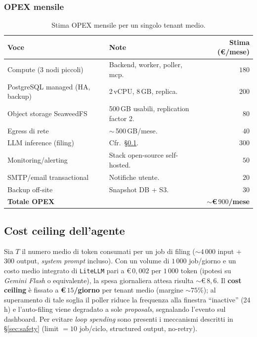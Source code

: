 \documentclass[11pt,a4paper,oneside]{article}
\begin{document}
\subsubsection{OPEX mensile}
\begin{table}[ht]
\centering
\small
\begin{tabularx}{\linewidth}{l X r}
\toprule
\textbf{Voce} & \textbf{Note} & \textbf{Stima (\euro/mese)} \\
\midrule
Compute (3 nodi piccoli)         & Backend, worker, poller, mcp.       & $180$ \\
PostgreSQL managed (HA, backup)  & 2\,vCPU, 8\,GB, replica.            & $200$ \\
Object storage SeaweedFS         & 500\,GB usabili, replication factor 2.& $80$ \\
Egress di rete                   & $\sim$\,500\,GB/mese.               & $40$ \\
LLM inference (filing)           & Cfr.\ \S\ref{sec:agent-cost}.        & $300$ \\
Monitoring/alerting              & Stack open-source self-hosted.      & $50$ \\
SMTP/email transactional         & Notifiche utente.                   & $20$ \\
Backup off-site                  & Snapshot DB + S3.                   & $30$ \\
\midrule
\textbf{Totale OPEX}             &                                     & \textbf{$\sim$\euro$\,900$/mese} \\
\bottomrule
\end{tabularx}
\caption{Stima OPEX mensile per un singolo tenant medio.}
\label{tab:opex}
\end{table}

\subsection{Cost ceiling dell'agente}
\label{sec:agent-cost}
Sia $T$ il numero medio di token consumati per un job di filing
($\sim 4\,000$ input + $300$ output, \emph{system prompt} incluso). Con un
volume di $1\,000$ job/giorno e un costo medio integrato di
\texttt{LiteLLM} pari a \euro$\,0{,}002$ per $1\,000$ token (ipotesi su
\emph{Gemini Flash} o equivalente), la spesa giornaliera attesa risulta
$\sim$\euro$\,8{,}6$. Il \textbf{cost ceiling} \`e fissato a
\textbf{\euro$\,15$/giorno} per tenant medio (margine $\sim 75\%$); al
superamento di tale soglia il poller riduce la frequenza alla finestra
``inactive'' (24\,h) e l'auto-filing viene degradato a sole
\emph{proposals}, segnalando l'evento sul dashboard. Per evitare \emph{loop
spending} sono presenti i meccanismi descritti in \S\ref{sec:safety} (limit
$=10$ job/ciclo, structured output, no-retry).
\end{document}

